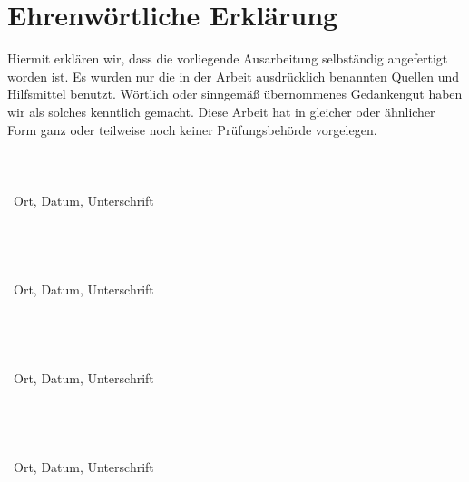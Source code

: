 
\section*{Ehrenwörtliche Erklärung}

Hiermit erklären wir, dass die vorliegende Ausarbeitung selbständig angefertigt worden ist. Es wurden nur die in der Arbeit ausdrücklich benannten Quellen und Hilfsmittel benutzt. Wörtlich oder sinngemäß übernommenes Gedankengut haben wir als solches kenntlich gemacht. Diese Arbeit hat in gleicher oder ähnlicher Form ganz oder teilweise noch keiner Prüfungsbehörde vorgelegen.
\\
\\
\\
\underline{\hspace{8cm}}\\\
Ort, Datum,     Unterschrift
\\
\\
\\
\\
\underline{\hspace{8cm}}\\\
Ort, Datum,     Unterschrift
\\
\\
\\
\\
\underline{\hspace{8cm}}\\\
Ort, Datum,     Unterschrift
\\
\\
\\

\\
\underline{\hspace{8cm}}\\\
Ort, Datum,     Unterschrift


